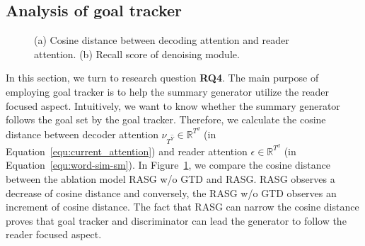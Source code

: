 \documentclass[letterpaper]{article}
\begin{document}
\subsection{Analysis of goal tracker}


\begin{figure}
  \centering
  \caption{(a) Cosine distance between decoding attention and reader attention. (b) Recall score of denoising module.}
  \label{fig:subfig} %
\end{figure}

In this section, we turn to research question \textbf{RQ4}.
The main purpose of employing goal tracker is to help the summary generator utilize the reader focused aspect.
Intuitively, we want to know whether the summary generator follows the goal set by the goal tracker.
Therefore, we calculate the cosine distance between decoder attention $\nu_{T^{\hat{Y}}} \in \mathbb{R}^{T^d}$ (in Equation~\ref{equ:current_attention}) and reader attention $\epsilon \in \mathbb{R}^{T^d}$ (in Equation~\ref{equ:word-sim-sm}).
In Figure~\ref{fig:subfig}, we compare the cosine distance between the ablation model RASG w/o GTD and RASG.
RASG observes a decrease of cosine distance and conversely, the RASG w/o GTD observes an increment of cosine distance.
The fact that RASG can narrow the cosine distance proves that goal tracker and discriminator can lead the generator to follow the reader focused aspect.
\end{document}
